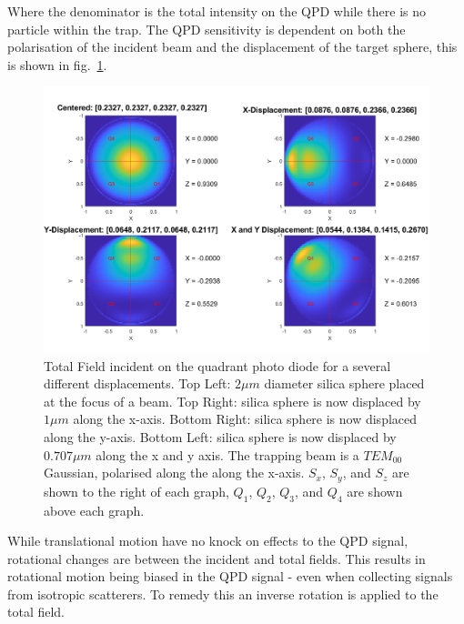 Where the denominator is the total intensity on the QPD while there is 
no particle within the trap. The QPD sensitivity is dependent on both 
the polarisation of the incident beam and the displacement of the target 
sphere, this is shown in fig.~\ref{fig:totalfield}.
\begin{figure}[h!]
	\centering
	\includegraphics[width=0.7\linewidth]{fixed_polarisation.png}
	\caption{Total Field incident on the quadrant photo diode for a several
		different displacements. Top Left: $2\mu m$ diameter silica sphere
		placed at the focus of a  beam. Top Right: silica sphere is now
		displaced by $1 \mu m$ along the x-axis. Bottom Right: silica sphere 
		is now displaced along the y-axis. Bottom Left: silica sphere is 
		now displaced by $0.707 \mu m$ along the x and y axis. The 
		trapping beam is a $TEM_{00}$ Gaussian, polarised along the along 
		the x-axis. $S_x$, $S_y$, and $S_z$ are shown to the right of each graph, $Q_1$, $Q_2$, $Q_3$, and $Q_4$ are shown above each graph.}
	\label{fig:totalfield}
\end{figure}

\newpage
While translational motion have no knock on effects to the QPD signal, 
rotational changes are between the incident and total fields. This results
in rotational motion being biased in the QPD signal - even when collecting
signals from isotropic scatterers. To remedy this an inverse rotation is
applied to the total field. 

